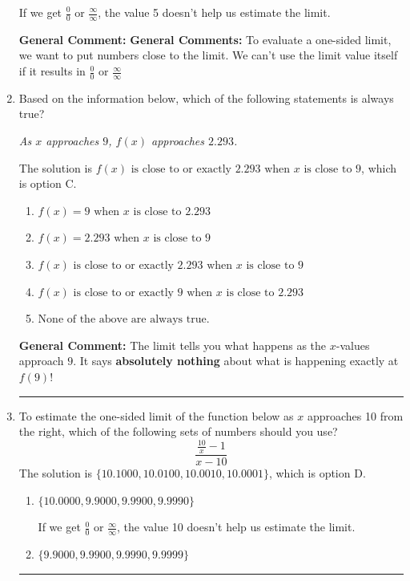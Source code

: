 \documentclass{extbook}[14pt]
\newcommand{\litem}[1]{\item #1

\rule{\textwidth}{0.4pt}}
\begin{document}
\begin{enumerate}
{\begin{enumerate}[label=\Alph*.]
If we get $\frac{0}{0}$ or $\frac{\infty}{\infty}$, the value 5 doesn't help us estimate the limit.
\end{enumerate}

\textbf{General Comment:} \textbf{General Comments:} To evaluate a one-sided limit, we want to put numbers close to the limit. We can't use the limit value itself if it results in $\frac{0}{0}$ or $\frac{\infty}{\infty}$
}
\litem{
Based on the information below, which of the following statements is always true?

\begin{center}
    \textit{ As $x$ approaches $9$, $f(x)$ approaches $2.293$. }
\end{center}
The solution is \( f(x) \text{ is close to or exactly } 2.293 \text{ when } x \text{ is close to } 9 \), which is option C.\begin{enumerate}[label=\Alph*.]
\item \( f(x) = 9 \text{ when } x \text{ is close to } 2.293 \)


\item \( f(x) = 2.293 \text{ when } x \text{ is close to } 9 \)


\item \( f(x) \text{ is close to or exactly } 2.293 \text{ when } x \text{ is close to } 9 \)


\item \( f(x) \text{ is close to or exactly } 9 \text{ when } x \text{ is close to } 2.293 \)


\item \( \text{None of the above are always true.} \)


\end{enumerate}

\textbf{General Comment:} The limit tells you what happens as the $x$-values approach $9$. It says \textbf{absolutely nothing} about what is happening exactly at $f(9)$!
}
\litem{
To estimate the one-sided limit of the function below as $x$ approaches 10 from the right, which of the following sets of numbers should you use?
\[ \frac{\frac{10}{x} - 1}{x - 10} \]The solution is \( \{ 10.1000, 10.0100, 10.0010, 10.0001 \} \), which is option D.\begin{enumerate}[label=\Alph*.]
\item \( \{ 10.0000, 9.9000, 9.9900, 9.9990 \} \)

If we get $\frac{0}{0}$ or $\frac{\infty}{\infty}$, the value 10 doesn't help us estimate the limit.
\item \( \{ 9.9000, 9.9900, 9.9990, 9.9999 \} \)


\end{enumerate}}
\end{enumerate}
\end{document}

